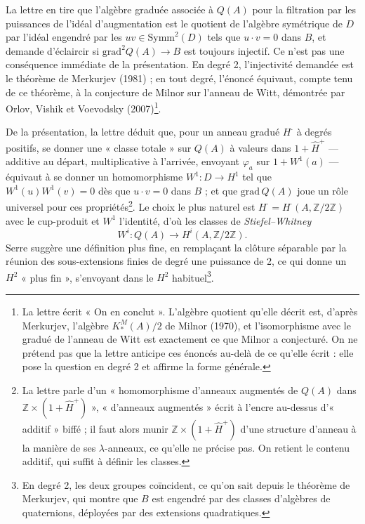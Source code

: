 \documentclass[11pt,a4paper]{article}
\begin{document}
La lettre en tire que l'algèbre graduée associée à $Q(A)$ pour la filtration
par les puissances de l'idéal d'augmentation est le quotient de l'algèbre
symétrique de $D$ par l'idéal engendré par les $uv \in \mathrm{Symm}^2(D)$ tels que
$u \cdot v = 0$ dans $B$, et demande d'éclaircir si
$\mathrm{grad}^2 Q(A) \to B$ est toujours injectif. Ce n'est pas une conséquence
immédiate de la présentation. En degré 2, l'injectivité demandée est le théorème
de Merkurjev (1981) ; en tout degré, l'énoncé équivaut, compte tenu de ce théorème,
à la conjecture de Milnor sur l'anneau de Witt, démontrée par Orlov, Vishik et
Voevodsky (2007)\footnote{La lettre écrit « On en conclut ». L'algèbre
quotient qu'elle décrit est, d'après Merkurjev, l'algèbre $K^M_*(A)/2$ de
Milnor (1970), et l'isomorphisme avec le gradué de l'anneau de Witt est
exactement ce que Milnor a conjecturé. On ne prétend pas que la lettre anticipe
ces énoncés au-delà de ce qu'elle écrit : elle pose la question en degré 2 et
affirme la forme générale.}.

De la présentation, la lettre déduit que, pour un anneau gradué $H^{\cdot}$ à
degrés positifs, se donner une « classe totale » sur $Q(A)$ à valeurs dans
$1 + \hat H^{+}$ — additive au départ, multiplicative à l'arrivée, envoyant
$\varphi_a$ sur $1 + W^1(a)$ — équivaut à se donner un homomorphisme
$W^1 : D \to H^1$ tel que $W^1(u) W^1(v) = 0$ dès que $u \cdot v = 0$ dans $B$ ; et
que $\mathrm{grad}\,Q(A)$ joue un rôle universel pour ces propriétés\footnote{La
lettre parle d'un « homomorphisme d'anneaux augmentés de $Q(A)$ dans
$\mathbb{Z} \times (1 + \hat H^{+})$ », « d'anneaux augmentés » écrit à l'encre
au-dessus d'« additif » biffé ; il faut alors munir $\mathbb{Z} \times
(1 + \hat H^{+})$ d'une structure d'anneau à la manière de ses $\lambda$-anneaux, ce
qu'elle ne précise pas. On retient le contenu additif, qui suffit à définir les
classes.}. Le choix le plus naturel est $H^{\cdot} = H^{\cdot}(A,
\mathbb{Z}/2\mathbb{Z})$ avec le cup-produit et $W^1$ l'identité, d'où les classes de
\emph{Stiefel--Whitney}
\[
W^i : Q(A) \to H^i(A, \mathbb{Z}/2\mathbb{Z}).
\]
Serre suggère une définition plus fine, en remplaçant la clôture séparable par
la réunion des sous-extensions finies de degré une puissance de 2, ce qui donne
un $H^2$ « plus fin », s'envoyant dans le $H^2$ habituel\footnote{En degré 2, les
deux groupes coïncident, ce qu'on sait depuis le théorème de Merkurjev, qui
montre que $B$ est engendré par des classes d'algèbres de quaternions, déployées
par des extensions quadratiques.}.
\end{document}
